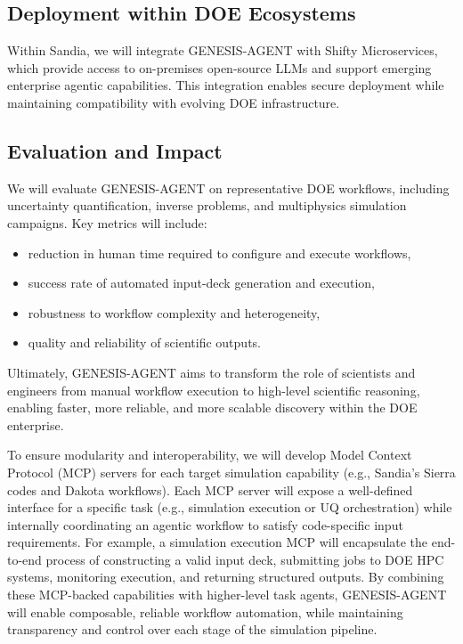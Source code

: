 \documentclass[11pt]{article} \usepackage[margin=1in]{geometry}
\begin{document}
\subsection*{Deployment within DOE Ecosystems}

Within Sandia, we will integrate GENESIS-AGENT with Shifty Microservices, which
provide access to on-premises open-source LLMs and support emerging enterprise
agentic capabilities. This integration enables secure deployment while
maintaining compatibility with evolving DOE infrastructure.

\subsection*{Evaluation and Impact}

We will evaluate GENESIS-AGENT on representative DOE workflows, including
uncertainty quantification, inverse problems, and multiphysics simulation
campaigns. Key metrics will include: \begin{itemize} \item reduction in human
time required to configure and execute workflows, \item success rate of
automated input-deck generation and execution, \item robustness to workflow
complexity and heterogeneity, \item quality and reliability of scientific
outputs.  \end{itemize}

Ultimately, GENESIS-AGENT aims to transform the role of scientists and engineers
from manual workflow execution to high-level scientific reasoning, enabling
faster, more reliable, and more scalable discovery within the DOE enterprise.





To ensure modularity and interoperability, we will develop Model Context
Protocol (MCP) servers for each target simulation capability (e.g., Sandia’s
Sierra codes and Dakota workflows). Each MCP server will expose a well-defined
interface for a specific task (e.g., simulation execution or UQ orchestration)
while internally coordinating an agentic workflow to satisfy code-specific input
requirements. For example, a simulation execution MCP will encapsulate the
end-to-end process of constructing a valid input deck, submitting jobs to DOE
HPC systems, monitoring execution, and returning structured outputs. By
combining these MCP-backed capabilities with higher-level task agents,
GENESIS-AGENT will enable composable, reliable workflow automation, while
maintaining transparency and control over each stage of the simulation pipeline.
\end{document}
